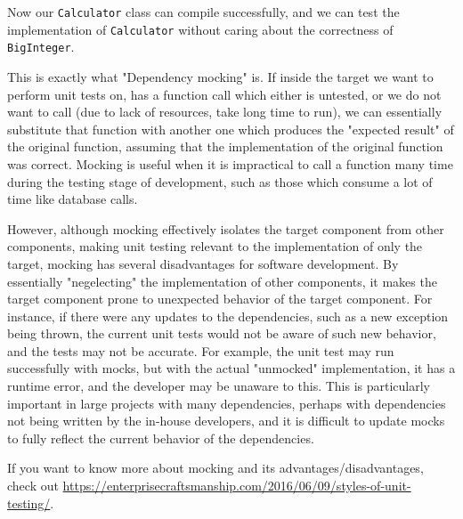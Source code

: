 
Now our \texttt{Calculator} class can compile successfully, and we can test the implementation of \texttt{Calculator} without caring about the correctness of \texttt{BigInteger}. 

This is exactly what "Dependency mocking" is. If inside the target we want to perform unit tests on, has a function call which either is untested, or we do not want to call (due to lack of resources, take long time to run), we can essentially substitute that function with another one which produces the "expected result" of the original function, assuming that the implementation of the original function was correct. Mocking is useful when it is impractical to call a function many time during the testing stage of development, such as those which consume a lot of time like database calls. 

However, although mocking effectively isolates the target component from other components, making unit testing relevant to the implementation of only the target, mocking has several disadvantages for software development. By essentially "negelecting" the implementation of other components, it makes the target component prone to unexpected behavior of the target component. For instance, if there were any updates to the dependencies, such as a new exception being thrown, the current unit tests would not be aware of such new behavior, and the tests may not be accurate. For example, the unit test may run successfully with mocks, but with the actual "unmocked" implementation, it has a runtime error, and the developer may be unaware to this. This is particularly important in large projects with many dependencies, perhaps with dependencies not being written by the in-house developers, and it is difficult to update mocks to fully reflect the current behavior of the dependencies. 

If you want to know more about mocking and its advantages/disadvantages, check out \url{https://enterprisecraftsmanship.com/2016/06/09/styles-of-unit-testing/}. 
